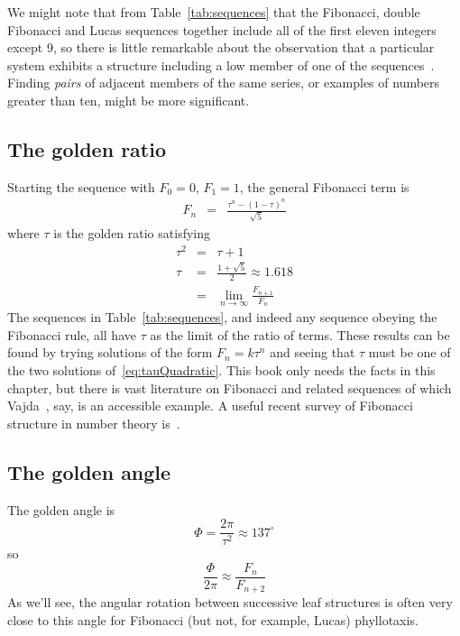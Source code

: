 We might note that from Table~\ref{tab:sequences} that the Fibonacci, double Fibonacci and Lucas sequences together include all  of the first eleven integers except 9, so there is little remarkable about the observation that a particular system exhibits a structure including a low member of one of the sequences~\cite{cookeFibonacciNumbersReveal2006}. Finding \textit{pairs} of adjacent members of the same series, or examples of numbers greater than ten, might be more significant.

\subsection{The golden ratio}
Starting the sequence with $F_0=0$, $F_1=1$, the general Fibonacci term is 
\begin{eqnarray}
F_n &=& \frac{\tau^n - (1-\tau)^n}{\sqrt{5}}
\end{eqnarray}
where $\tau$ is the golden ratio 
satisfying
\begin{eqnarray}
\tau^2 &=& \tau+1 \label{eq:tauQuadratic}
\\
\tau &=& \frac{1+\sqrt{5}}{2} \approx 1.618
\\
&=& \lim_{n\rightarrow\infty} \frac{F_{n+1}}{F_n} 
\end{eqnarray}
The sequences in Table~\ref{tab:sequences}, and indeed any sequence obeying the Fibonacci rule, all have $\tau$  as the limit of the ratio of terms. These results can be found by trying solutions of the form $F_n=k\tau^n$ and seeing that $\tau$ must be one of the two solutions of~\eqref{eq:tauQuadratic}. This book only needs the facts in this chapter, but there is vast literature on Fibonacci and related sequences of which Vajda~\cite{vajdaFibonacciLucasNumbers2008}, say, is an  accessible example. 
A useful recent survey of Fibonacci structure in number theory is~\cite{ballotLucasSequencesTheory2023}.

\subsection{The golden angle}
The golden angle is
\[
\Phi = \frac{2\pi}{\tau^2}  \approx 137^\circ
\]
so
\[
\frac{\Phi}{2 \pi} \approx \frac{F_{n}}{F_{n+2}}
\]
As we'll see, the angular rotation between successive leaf structures is often very close to this angle for Fibonacci (but not, for example, Lucas) phyllotaxis.




